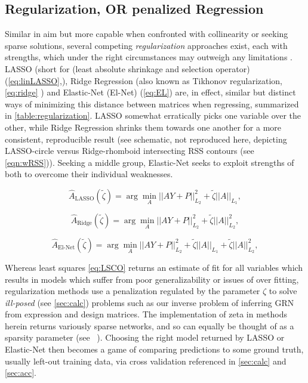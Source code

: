 \subsection{Regularization, OR penalized Regression}
\label{sec:reg}
Similar in aim but more capable when confronted with collinearity or seeking sparse solutions, several competing \emph{regularization} approaches exist, each with strengths, which under the right circumstances may outweigh any limitations \citep[p.69-73,661-668]{friedman2001elements}. LASSO (short for (least absolute shrinkage and selection operator) (\cref{eq:linLASSO},\citep{tibshirani1996regression}), Ridge Regression (also known as Tikhonov regularization, \cref{eq:ridge} \citep{hoerl1970ridge}) and Elastic-Net (El-Net) (\cref{eq:EL}\citep{zou2005regularization}) are, in effect, similar but distinct ways of minimizing this distance between matrices when regressing, summarized in \cref{table:regularization}. LASSO somewhat erratically picks one variable over the other, while Ridge Regression shrinks them towards one another for a more consistent, reproducible result \citep{ng2004feature,tibshirani1996regression}(see schematic, not reproduced here, depicting LASSO-circle versus Ridge-rhomboid intersecting RSS contours (see \cref{eqn:wRSS})). Seeking a middle group, Elastic-Net seeks to exploit strengths of both to overcome their individual weaknesses.

 \begin{equation}\label{eq:linLASSO}
  \hat{A}_{\textrm{LASSO}}(\tilde{\zeta}) = \arg \min_{A} ||A Y+P||^2_{L_2} + \tilde{\zeta} ||A||_{L_1},
\end{equation}

 \begin{equation}\label{eq:ridge}
  \hat{A}_{\textrm{Ridge}}(\tilde{\zeta}) = \arg \min_{A} ||A Y+P||^2_{L_2} + \tilde{\zeta} ||A||^2_{L_2},
\end{equation}

 \begin{equation}\label{eq:EL}
  \hat{A}_{\textrm{El-Net}}(\tilde{\zeta}) = \arg \min_{A} ||A Y+P||^2_{L_2} + \tilde{\zeta} ||A||_{L_1}+ \tilde{\zeta} ||A||^2_{L_2},
\end{equation}

Whereas least squares \cref{eq:LSCO} returns an estimate of fit for all variables which results in models which suffer from poor generalizability or issues of over fitting, regularization methods use a penalization regulated by the parameter $\zeta$ to solve \emph{ill-posed} (see \cref{sec:calc}) problems such as our inverse problem of inferring GRN from expression and design matrices. The implementation of zeta in methods herein returns variously sparse networks, and so can equally be thought of as a sparsity parameter (see ~). Choosing the right model returned by LASSO or Elastic-Net then becomes a game of comparing predictions to some ground truth, usually left-out training data, \ie via cross validation referenced in \cref{sec:calc} and \cref{sec:acc}.

